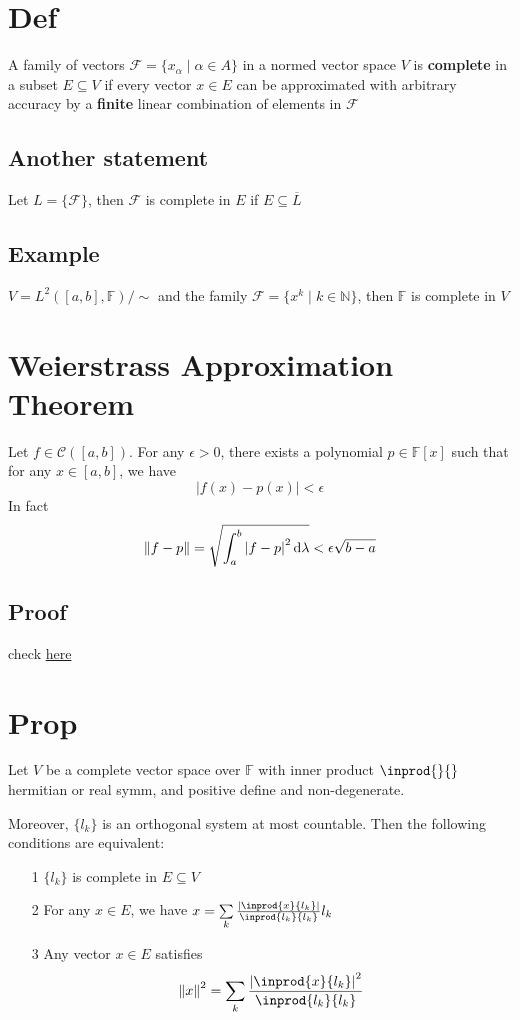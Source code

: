 \documentclass{book}
\newcommand{\abs}[1]{\left\lvert #1 \right\rvert}
\begin{document}
\section{Def}
A family of vectors $\mathcal{F}=\{x_\alpha\mid\alpha\in A\}$ in a normed vector space $V$ is \textbf{complete} in a subset $E\subseteq V$ if every vector $x\in E$ can be approximated with arbitrary accuracy by a \textbf{finite} linear combination of elements in $\mathcal{F}$
\subsection*{Another statement}
Let $L=\{\mathcal{F}\}$, then $\mathcal{F}$ is complete in $E$ if $E\subseteq\overline{L}$
\subsection*{Example}
$V=L^2([a,b],\mathbb{F})/\sim$ and the family $\mathcal{F}=\{x^k\mid k\in \mathbb{N}\}$, then $\mathbb{F}$ is complete in $V$
\section{Weierstrass Approximation Theorem}
Let $f\in \mathcal{C}([a,b])$. For any $\epsilon>0$, there exists a polynomial $p\in \mathbb{F}[x]$ such that for any $x\in [a,b]$, we have
$$\abs{f(x)-p(x)}<\epsilon$$
In fact$$\norm{f-p}=\sqrt{\int_a^b\abs{f-p}^2\text{d}\lambda}<\epsilon\sqrt{b-a}$$
\subsection*{Proof}
check \href{https://proofwiki.org/wiki/Weierstrass_Approximation_Theorem}{here}
\section{Prop}
\label{Prop 63.1}
Let $V$ be a complete vector space over $\mathbb{F}$ with inner product $\inprod{}{}$ hermitian or real symm, and positive define and non-degenerate.

Moreover, $\{l_k\}$ is an orthogonal system at most countable. Then the following conditions are equivalent:
\begin{itemize}
    \item [1]$\{l_k\}$ is complete in $E\subseteq V$
    \item [2]For any $x\in E$, we have $x=\sum\limits_{k}\frac{\abs{\inprod{x}{l_k}}}{\inprod{l_k}{l_k}}l_k$
    \item [3]Any vector $x\in E$ satisfies$$\norm{x}^2=\sum\limits_{k}\frac{\abs{\inprod{x}{l_k}}^2}{\inprod{l_k}{l_k}}$$
\end{itemize}
\end{document}
